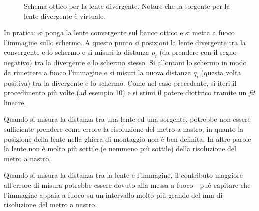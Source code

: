 \documentclass{lab1-article}
\begin{document}
\begin{article}
\begin{figure}[htb!]
\begin{center}
\begin{tikzpicture}[scale=1.25]
  \end{tikzpicture}
  \caption{Schema ottico per la lente divergente. 
    Notare che la sorgente per la lente divergente \`e virtuale.}
  \label{fig:divergente}
\end{center}
\end{figure}

In pratica: si ponga la lente convergente sul banco ottico e si metta a fuoco
l'immagine sullo schermo. A questo punto si posizioni la lente divergente
tra la convergente e lo schermo e si misuri la distanza $p_i$ (da prendere con
il segno negativo) tra la divergente e lo schermo stesso. Si allontani lo
schermo in modo da rimettere a fuoco l'immagine e si misuri la nuova distanza
$q_i$ (questa volta positiva) tra la divergente e lo schermo. Come nel caso
precedente, si iteri il procedimento pi\`u volte (ad esempio 10) e si stimi
il potere diottrico tramite un \emph{fit} lineare.
 

\secconsiderations

Quando si misura la distanza tra una lente ed una sorgente, potrebbe non essere
sufficiente prendere come errore la risoluzione del metro a nastro, in quanto
la posizione della lente nella ghiera di montaggio non \`e ben definita.
In altre parole la lente non \`e molto pi\`u sottile (e nemmeno pi\`u sottile)
della risoluzione del metro a nastro.

Quando si misura la distanza tra la lente e l'immagine, il contributo maggiore
all'errore di misura potrebbe essere dovuto alla messa a fuoco---pu\`o capitare
che l'immagine appaia a fuoco su un intervallo molto pi\`u grande del mm di
risoluzione del metro a nastro.


\end{article}
\end{document}
